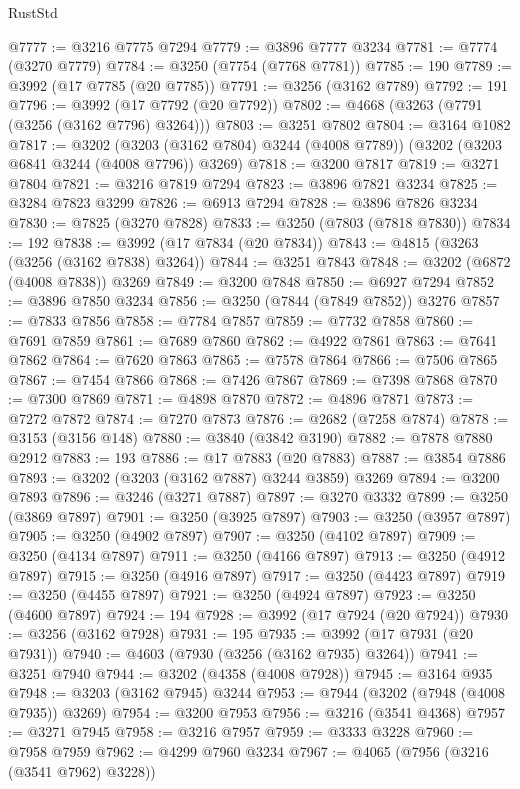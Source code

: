 \begin{lexlean}{RustStd}
\begin{coremodule}
@7777 := @3216 @7775 @7294
@7779 := @3896 @7777 @3234
@7781 := @7774 (@3270 @7779)
@7784 := @3250 (@7754 (@7768 @7781))
@7785 := 190
@7789 := @3992 (@17 @7785 (@20 @7785))
@7791 := @3256 (@3162 @7789)
@7792 := 191
@7796 := @3992 (@17 @7792 (@20 @7792))
@7802 := @4668 (@3263 (@7791 (@3256 (@3162 @7796) @3264)))
@7803 := @3251 @7802
@7804 := @3164 @1082
@7817 := @3202
    (@3203 (@3162 @7804) @3244 (@4008 @7789))
    (@3202 (@3203 @6841 @3244 (@4008 @7796)) @3269)
@7818 := @3200 @7817
@7819 := @3271 @7804
@7821 := @3216 @7819 @7294
@7823 := @3896 @7821 @3234
@7825 := @3284 @7823 @3299
@7826 := @6913 @7294
@7828 := @3896 @7826 @3234
@7830 := @7825 (@3270 @7828)
@7833 := @3250 (@7803 (@7818 @7830))
@7834 := 192
@7838 := @3992 (@17 @7834 (@20 @7834))
@7843 := @4815 (@3263 (@3256 (@3162 @7838) @3264))
@7844 := @3251 @7843
@7848 := @3202 (@6872 (@4008 @7838)) @3269
@7849 := @3200 @7848
@7850 := @6927 @7294
@7852 := @3896 @7850 @3234
@7856 := @3250 (@7844 (@7849 @7852)) @3276
@7857 := @7833 @7856
@7858 := @7784 @7857
@7859 := @7732 @7858
@7860 := @7691 @7859
@7861 := @7689 @7860
@7862 := @4922 @7861
@7863 := @7641 @7862
@7864 := @7620 @7863
@7865 := @7578 @7864
@7866 := @7506 @7865
@7867 := @7454 @7866
@7868 := @7426 @7867
@7869 := @7398 @7868
@7870 := @7300 @7869
@7871 := @4898 @7870
@7872 := @4896 @7871
@7873 := @7272 @7872
@7874 := @7270 @7873
@7876 := @2682 (@7258 @7874)
@7878 := @3153 (@3156 @148)
@7880 := @3840 (@3842 @3190)
@7882 := @7878 @7880 @2912
@7883 := 193
@7886 := @17 @7883 (@20 @7883)
@7887 := @3854 @7886
@7893 := @3202 (@3203 (@3162 @7887) @3244 @3859) @3269
@7894 := @3200 @7893
@7896 := @3246 (@3271 @7887)
@7897 := @3270 @3332
@7899 := @3250 (@3869 @7897)
@7901 := @3250 (@3925 @7897)
@7903 := @3250 (@3957 @7897)
@7905 := @3250 (@4902 @7897)
@7907 := @3250 (@4102 @7897)
@7909 := @3250 (@4134 @7897)
@7911 := @3250 (@4166 @7897)
@7913 := @3250 (@4912 @7897)
@7915 := @3250 (@4916 @7897)
@7917 := @3250 (@4423 @7897)
@7919 := @3250 (@4455 @7897)
@7921 := @3250 (@4924 @7897)
@7923 := @3250 (@4600 @7897)
@7924 := 194
@7928 := @3992 (@17 @7924 (@20 @7924))
@7930 := @3256 (@3162 @7928)
@7931 := 195
@7935 := @3992 (@17 @7931 (@20 @7931))
@7940 := @4603 (@7930 (@3256 (@3162 @7935) @3264))
@7941 := @3251 @7940
@7944 := @3202 (@4358 (@4008 @7928))
@7945 := @3164 @935
@7948 := @3203 (@3162 @7945) @3244
@7953 := @7944 (@3202 (@7948 (@4008 @7935)) @3269)
@7954 := @3200 @7953
@7956 := @3216 (@3541 @4368)
@7957 := @3271 @7945
@7958 := @3216 @7957
@7959 := @3333 @3228
@7960 := @7958 @7959
@7962 := @4299 @7960 @3234
@7967 := @4065 (@7956 (@3216 (@3541 @7962) @3228))

\end{coremodule}
\end{lexlean}
